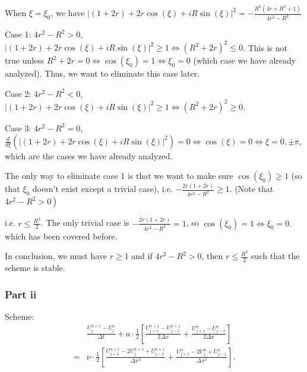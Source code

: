 \begin{answer}
    When $\xi = \xi_0$, we have $\lvert (1+2r) + 2r\cos(\xi) + iR\sin(\xi)\rvert^2 = -\tfrac{R^2(4r+R^2+1)}{4r^2-R^2}$
    
    \quad Case 1: $4r^2 - R^2 > 0$, $\lvert (1+2r) + 2r\cos(\xi) + iR\sin(\xi)\rvert^2 \geq 1 \Leftrightarrow (R^2 + 2r)^2 \leq 0$. This is not true unless $R^2 + 2r = 0 \Leftrightarrow \cos(\xi_0) = 1 \Leftrightarrow \xi_0 = 0$ (which case we have already analyzed). Thus, we want to eliminate this case later.
    
    \quad Case 2: $4r^2 - R^2 < 0$, $\lvert (1+2r) + 2r\cos(\xi) + iR\sin(\xi)\rvert^2 \geq 1 \Leftrightarrow (R^2 + 2r)^2 \geq 0$.
    
    \quad Case 3: $4r^2 - R^2 = 0$, $\tfrac{d}{d\xi}(\lvert (1+2r) + 2r\cos(\xi) + iR\sin(\xi) \rvert^2) = 0 \Leftrightarrow \cos(\xi) = 0 \Leftrightarrow \xi = 0, \pm \pi$, which are the cases we have already analyzed.
    
    The only way to eliminate case 1 is that we want to make sure $\cos (\xi_0) \geqslant 1$ (so that $\xi_0$ doesn't exist except a trivial case), i.e. $-\tfrac{2 r(1+2 r)}{4r^2-R^2} \geqslant 1$. (Note that $\left.4 r^2-R^2>0\right)$
    
    i.e. $r \leq \frac{R^2}{2}$. The only trivial case is $-\frac{2 r(1+2r)}{4r^2-R^2}=1$, so $\cos \left(\xi_0\right)=1 \Leftrightarrow \xi_0=0.$ which has been covered before.
    
    In conclusion, we must have $r \geq 1$ and if $4r^2-R^2>0$, then $r \leq \frac{R^2}{2}$ such that the scheme is stable.
\end{answer}

\subsubsection{Part ii}

\begin{question}
    Scheme:
        $$
        \begin{aligned}
            &\frac{U_j^{n+1}-U_j^n}{\Delta t}+a \cdot \frac{1}{2}\left[\frac{U_{j+1}^{n+1}-U_{j-1}^{n+1}}{2 \Delta x}+\frac{U_{j+1}^n-U_{j-1}^n}{2 \Delta x}\right]\\
        =&\nu \cdot \frac{1}{2}\left[\frac{U_{j+1}^{n+1}-2 U_j^{n+1}+U_{j-1}^{n+1}}{\Delta x^2}+\frac{U_{j+1}^n-2 U_j^n+U_{j-1}^n}{\Delta x^2}\right] .
        \end{aligned}
        $$
\end{question}

